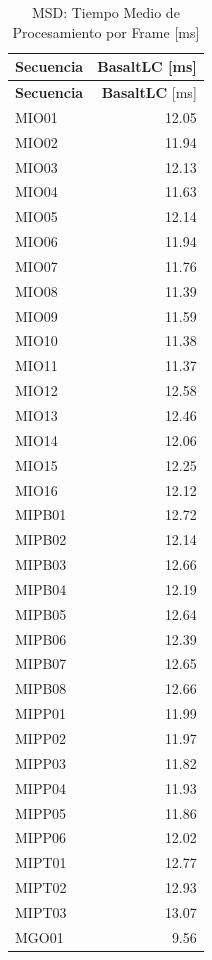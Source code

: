 \begin{longtable}{lr}

\caption{MSD: Tiempo Medio de Procesamiento por Frame [ms]}
\label{tab:msd_mean_frame_time} \\

\toprule
\textbf{Secuencia} & \textbf{BasaltLC} [ms] \\
\midrule
\endfirsthead

\toprule
\textbf{Secuencia} & \textbf{BasaltLC} [ms] \\
\midrule
\endhead

\bottomrule
\endfoot

MIO01 & 12.05 \\
MIO02 & 11.94 \\
MIO03 & 12.13 \\
MIO04 & 11.63 \\
MIO05 & 12.14 \\
MIO06 & 11.94 \\
MIO07 & 11.76 \\
MIO08 & 11.39 \\
MIO09 & 11.59 \\
MIO10 & 11.38 \\
MIO11 & 11.37 \\
MIO12 & 12.58 \\
MIO13 & 12.46 \\
MIO14 & 12.06 \\
MIO15 & 12.25 \\
MIO16 & 12.12 \\
MIPB01 & 12.72 \\
MIPB02 & 12.14 \\
MIPB03 & 12.66 \\
MIPB04 & 12.19 \\
MIPB05 & 12.64 \\
MIPB06 & 12.39 \\
MIPB07 & 12.65 \\
MIPB08 & 12.66 \\
MIPP01 & 11.99 \\
MIPP02 & 11.97 \\
MIPP03 & 11.82 \\
MIPP04 & 11.93 \\
MIPP05 & 11.86 \\
MIPP06 & 12.02 \\
MIPT01 & 12.77 \\
MIPT02 & 12.93 \\
MIPT03 & 13.07 \\
\midrule
MGO01 & 9.56 \\

\end{longtable}

